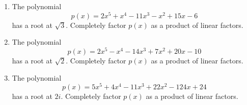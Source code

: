 \documentclass{article}
\begin{document}
\ActivityTitle[class={College Algebra}, number={5}, name={Polynomials 3}]

\begin{enumerate}
\item The polynomial \[ p(x) = 2x^5 + x^4 - 11x^3 - x^2 + 15x - 6 \] has a root at $\sqrt{3}$. Completely factor $p(x)$ as a product of linear factors. \vspace{7cm}

\newpage

\item The polynomial \[ p(x) = 2x^5 - x^4 - 14x^3 + 7x^2 + 20x - 10 \] has a root at $\sqrt{2}$. Completely factor $p(x)$ as a product of linear factors. \vspace{7cm}

\newpage

\item The polynomial \[ p(x) = 5x^5 + 4x^4 - 11x^3 + 22x^2 - 124x + 24 \] has a root at $2i$. Completely factor $p(x)$ as a product of linear factors. \vspace{7cm}

\end{enumerate}
\end{document}
